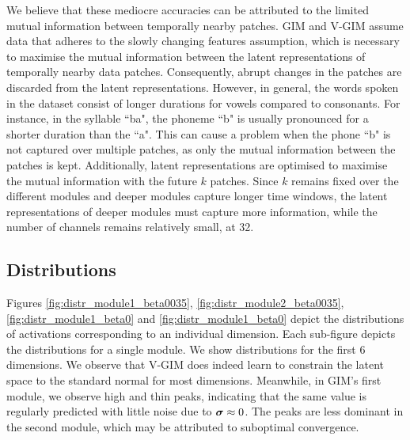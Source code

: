 	We believe that these mediocre accuracies can be attributed to the limited mutual information between temporally nearby patches. GIM and V-GIM assume data that adheres to the slowly changing features assumption, which is necessary to maximise the mutual information between the latent representations of temporally nearby data patches. Consequently, abrupt changes in the patches are discarded from the latent representations. 
	However, in general, the words spoken in the dataset consist of longer durations for vowels compared to consonants. For instance, in the syllable ``ba", the phoneme ``b" is usually pronounced for a shorter duration than the ``a". This can cause a problem when the phone ``b" is not captured over multiple patches, as only the mutual information between the patches is kept. Additionally, latent representations are optimised to maximise the mutual information with the future $k$ patches. Since $k$ remains fixed over the different modules and deeper modules capture longer time windows, the latent representations of deeper modules must capture more information, while the number of channels remains relatively small, at 32.
	
				
	\subsection{Distributions}
		Figures \ref{fig:distr_module1_beta0035}, \ref{fig:distr_module2_beta0035}, \ref{fig:distr_module1_beta0} and \ref{fig:distr_module1_beta0} depict the distributions of activations corresponding to an individual dimension. Each sub-figure depicts the distributions for a single module. We show distributions for the first 6 dimensions. We observe that V-GIM does indeed learn to constrain the latent space to the standard normal for most dimensions. Meanwhile, in GIM's first module, we observe high and thin peaks, indicating that the same value is regularly predicted with little noise due to $\bm{\sigma} \approx 0$. The peaks are less dominant in the second module, which may be attributed to suboptimal convergence.
		

		


